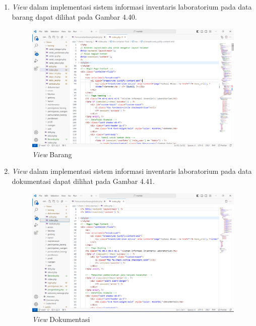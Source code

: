 \begin{enumerate}
  \item \textit{View} dalam implementasi sistem informasi inventaris laboratorium pada data barang dapat dilihat pada Gambar 4.40.
        \begin{figure}
          \centering
          \includegraphics[width=0.82\linewidth]{konten//gambar/view barang.png}
          \caption{\textit{View} Barang}
          \label{fig:enter-label}
        \end{figure}

  \item \textit{View} dalam implementasi sistem informasi inventaris laboratorium pada data dokumentasi dapat dilihat pada Gambar 4.41.
        \begin{figure}
          \centering
          \includegraphics[width=0.82\linewidth]{konten//gambar/view dokumentasi.png}
          \caption{\textit{View} Dokumentasi}
          \label{fig:enter-label}
        \end{figure}


\end{enumerate}
